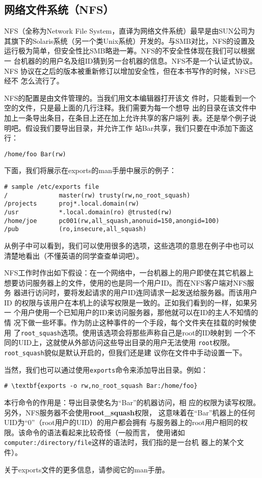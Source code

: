\subsection{网络文件系统（NFS）}
\label{sec:networkConfiguration:networkFileSystem:networkFileSystem}
NFS（全称为Network File System，直译为网络文件系统）最早是由SUN公司为
其旗下的Solaris系统（另一个类Unix系统）开发的。与SMB对比，NFS的设置及
运行极为简单，但安全性比SMB略逊一筹。NFS的不安全性体现在我们可以根据一
台机器的的用户名及组ID猜到另一台机器的信息。NFS不是一个认证式协议。NFS
协议在之后的版本被重新修订以增加安全性，但在本书写作的时候，NFS已经不
怎么流行了。

NFS的配置是由文件管理的。当我们用文本编辑器打开该文
件时，只能看到一个空的文件，只是最上面的几行注释。我们需要为每一个想导
出的目录在该文件中加上一条导出条目，在条目上还在加上允许共享的客户端列
表。还是举个例子说明吧。假设我们要导出目录，并允许工作
站Bar共享，我们只要在中添加下面这行：
\begin{Verbatim}[frame=single]
/home/foo Bar(rw)
\end{Verbatim}
下面，我们将展示在exports的man手册中展示的例子：
\begin{Verbatim}[frame=single]
# sample /etc/exports file
/              master(rw) trusty(rw,no_root_squash)
/projects      proj*.local.domain(rw)
/usr           *.local.domain(ro) @trusted(rw)
/home/joe      pc001(rw,all_squash,anonuid=150,anongid=100)
/pub           (ro,insecure,all_squash)
\end{Verbatim}
从例子中可以看到，我们可以使用很多的选项，这些选项的意思在例子中也可以
清楚地看出（不懂英语的同学查查单词吧）。

NFS工作时作出如下假设：在一个网络中，一台机器上的用户即使在其它机器上
想要访问服务器上的文件，使用的也是同一个用户ID。而在NFS客户端对NFS服务
器进行访问时，要将发起请求的用户ID连同请求一起发送给服务器。而该用户ID
的权限与该用户在本机上的读写权限是一致的。正如我们看到的一样，如果另一
个用户使用一个已知用户的ID来访问服务器，那他就可以在ID的主人不知情的情
况下做一些坏事。作为防止这种事件的一个手段，每个文件夹在挂载的时候使用
了\texttt{root\_squash}选项。使用该选项会将那些声称自己是root的ID映射到
一个不同的UID上，这就使从外部访问这些导出目录的用户无法使用
\texttt{root}权限。\texttt{root\_squash}貌似是默认开启的，但我们还是建
议你在文件中手动设置一下。

当然，我们也可以通过使用\texttt{exports}命令来添加导出目录。例如：
\begin{Verbatim}[frame=single,commandchars=\\\{\}]
# \textbf{exports -o rw,no_root_squash Bar:/home/foo}
\end{Verbatim}
本行命令的作用是：导出目录使名为``Bar''的机器访问，相
应的权限为读写权限。另外，NFS服务器不会使用\textbf{root\_squash}权限，
这意味着在``Bar''机器上的任何UID为``0''（root用户的UID）的用户都会拥有
与服务器上的root用户相同的权限。该命令的语法看起来比较奇怪（一般而言，
使用诸如\texttt{computer:/directory/file}这样的语法时，我们指的是一台机
器上的某个文件）。

关于exports文件的更多信息，请参阅它的man手册。





